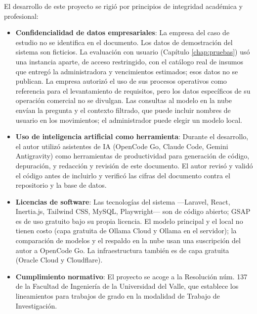 El desarrollo de este proyecto se rigió por principios de integridad académica y profesional:

\begin{itemize}
    \item \textbf{Confidencialidad de datos empresariales}: La empresa del caso de estudio no se identifica en el documento. Los datos de demostración del sistema son ficticios. La evaluación con usuario (Capítulo \ref{chap:pruebas}) usó una instancia aparte, de acceso restringido, con el catálogo real de insumos que entregó la administradora y vencimientos estimados; esos datos no se publican. La empresa autorizó el uso de sus procesos operativos como referencia para el levantamiento de requisitos, pero los datos específicos de su operación comercial no se divulgan. Las consultas al modelo en la nube envían la pregunta y el contexto filtrado, que puede incluir nombres de usuario en los movimientos; el administrador puede elegir un modelo local.
    \item \textbf{Uso de inteligencia artificial como herramienta}: Durante el desarrollo, el autor utilizó asistentes de IA (OpenCode Go, Claude Code, Gemini Antigravity) como herramientas de productividad para generación de código, depuración, y redacción y revisión de este documento. El autor revisó y validó el código antes de incluirlo y verificó las cifras del documento contra el repositorio y la base de datos.
    \item \textbf{Licencias de software}: Las tecnologías del sistema ---Laravel, React, Inertia.js, Tailwind CSS, MySQL, Playwright--- son de código abierto; GSAP es de uso gratuito bajo su propia licencia. El modelo principal y el local no tienen costo (capa gratuita de Ollama Cloud y Ollama en el servidor); la comparación de modelos y el respaldo en la nube usan una suscripción del autor a OpenCode Go. La infraestructura también es de capa gratuita (Oracle Cloud y Cloudflare).
    \item \textbf{Cumplimiento normativo}: El proyecto se acoge a la Resolución núm. 137 de la Facultad de Ingeniería de la Universidad del Valle, que establece los lineamientos para trabajos de grado en la modalidad de Trabajo de Investigación.
\end{itemize}

